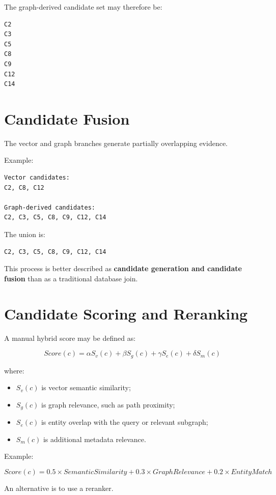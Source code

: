 \documentclass[11pt,a4paper]{article}
\begin{document}
The graph-derived candidate set may therefore be:

\begin{lstlisting}
C2
C3
C5
C8
C9
C12
C14
\end{lstlisting}

\section{Candidate Fusion}

The vector and graph branches generate partially overlapping evidence.

Example:

\begin{lstlisting}
Vector candidates:
C2, C8, C12

Graph-derived candidates:
C2, C3, C5, C8, C9, C12, C14
\end{lstlisting}

The union is:

\begin{lstlisting}
C2, C3, C5, C8, C9, C12, C14
\end{lstlisting}

This process is better described as \textbf{candidate generation and candidate fusion} than as a traditional database join.

\section{Candidate Scoring and Reranking}

A manual hybrid score may be defined as:

\[
Score(c) =
\alpha S_v(c) +
\beta S_g(c) +
\gamma S_e(c) +
\delta S_m(c)
\]

where:

\begin{itemize}
\item $S_v(c)$ is vector semantic similarity;
\item $S_g(c)$ is graph relevance, such as path proximity;
\item $S_e(c)$ is entity overlap with the query or relevant subgraph;
\item $S_m(c)$ is additional metadata relevance.
\end{itemize}

Example:

\[
Score(c) =
0.5 \times SemanticSimilarity +
0.3 \times GraphRelevance +
0.2 \times EntityMatch
\]

An alternative is to use a reranker.
\end{document}
